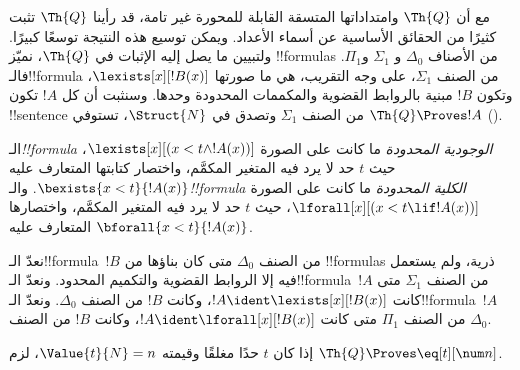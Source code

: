 \documentclass[../../../include/open-logic-section]{subfiles}
\begin{document}

مع أن $\Th{Q}$ وامتداداتها المتسقة القابلة للمحورة غير تامة،
قد رأينا $\Th{Q}$ تثبت كثيرًا من الحقائق الأساسية عن أسماء الأعداد.
ويمكن توسيع هذه النتيجة توسعًا كبيرًا. ولتبيين ما يصل إليه الإثبات في
$\Th{Q}$، نميّز !!{formula}s من الأصناف $\Delta_0$ و
$\Sigma_1$ و$\Pi_1$.
فالـ!!{formula} من الصنف $\Sigma_1$، على وجه التقريب،
هي ما صورتها $\lexists[x][!B(x)]$، وتكون $!B$ مبنية بالروابط القضوية
والمكممات المحدودة وحدها. وسنثبت أن كل $!A$ تكون !!{sentence}
من الصنف $\Sigma_1$ وتصدق في $\Struct{N}$،
تستوفي $\Th{Q}\Proves !A$ ().

\begin{defn}
الـ\emph{!!{formula} الوجودية المحدودة} ما كانت على الصورة
$\lexists[x][(x<t\land !A(x))]$، حيث $t$ حد لا يرد فيه المتغير المكمَّم،
واختصار كتابتها المتعارف عليه $\bexists{x<t}{!A(x)}$.
%
والـ\emph{!!{formula} الكلية المحدودة} ما كانت على الصورة
$\lforall[x][(x<t\lif !A(x))]$، حيث $t$ حد لا يرد فيه المتغير المكمَّم،
واختصارها المتعارف عليه $\bforall{x<t}{!A(x)}$.
\end{defn}

\begin{defn}
نعدّ الـ!!{formula}~$!B$ من الصنف $\Delta_0$ متى كان بناؤها من
!!{formula}s ذرية، ولم يستعمل فيه إلا الروابط القضوية والتكميم المحدود.
%
ونعدّ الـ!!{formula}~$!A$ من الصنف $\Sigma_1$ متى كانت
$!A\ident\lexists[x][!B(x)]$، وكانت $!B$ من الصنف $\Delta_0$.
%
ونعدّ الـ!!{formula}~$!A$ من الصنف $\Pi_1$ متى كانت
$!A\ident\lforall[x][!B(x)]$، وكانت $!B$ من الصنف $\Delta_0$.
\end{defn}

\begin{lem}
 إذا كان $t$ حدًا مغلقًا وقيمته
$\Value{t}{N}=n$، لزم $\Th{Q}\Proves\eq[t][\num n]$.
\end{lem}
\end{document}
